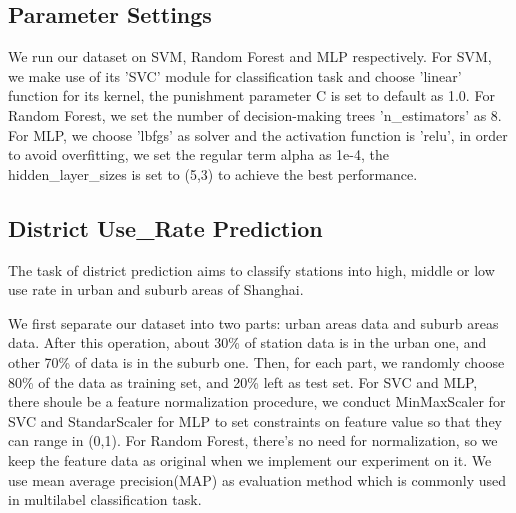 \subsection{Parameter Settings}
We run our dataset on SVM, Random Forest and MLP respectively. For SVM, we make use of its 'SVC' module for classification task and choose 'linear' function for its kernel, the punishment parameter C is set to default as 1.0. For Random Forest, we set the number of decision-making trees 'n\_estimators' as 8. For MLP, we choose 'lbfgs' as solver and the activation function is 'relu', in order to avoid overfitting, we set the regular term alpha as 1e-4, the hidden\_layer\_sizes is set to (5,3) to achieve the best performance.

\subsection{District Use\_Rate Prediction}
The task of district prediction aims to classify stations into high, middle or low use rate in urban and suburb areas of Shanghai.

We first separate our dataset into two parts: urban areas data and suburb areas data. After this operation, about 30\% of station data is in the urban one, and other 70\% of data is in the suburb one. Then, for each part, we randomly choose 80\% of the data as training set, and 20\% left as test set. For SVC and MLP, there shoule be a feature normalization procedure, we conduct MinMaxScaler for SVC and StandarScaler for MLP to set constraints on feature value so that they can range in (0,1). For Random Forest, there's no need for normalization, so we keep the feature data as original when we implement our experiment on it. We use mean average precision(MAP) as evaluation method which is commonly used in multilabel classification task.

